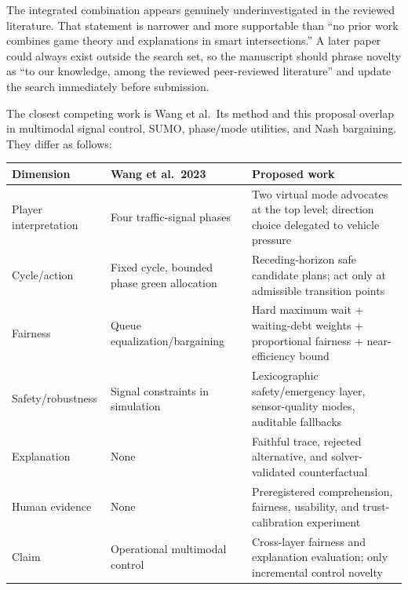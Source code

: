 \documentclass[
  english,
  11pt,
  a4paper,
]{article}
\newcounter{none} %
\begin{document}
The integrated combination appears genuinely underinvestigated in the
reviewed literature. That statement is narrower and more supportable
than ``no prior work combines game theory and explanations in smart
intersections.'' A later paper could always exist outside the search
set, so the manuscript should phrase novelty as ``to our knowledge,
among the reviewed peer-reviewed literature'' and update the search
immediately before submission.

The closest competing work is Wang et al.~Its method and this proposal
overlap in multimodal signal control, SUMO, phase/mode utilities, and
Nash bargaining. They differ as follows:

{\def\LTcaptype{none} %
\begin{longtable}[]{@{}
  >{\raggedright\arraybackslash}p{}
  >{\raggedright\arraybackslash}p{}
  >{\raggedright\arraybackslash}p{}@{}}
\toprule\noalign{}
\begin{minipage}[b]{\linewidth}\raggedright
Dimension
\end{minipage} & \begin{minipage}[b]{\linewidth}\raggedright
Wang et al.~2023
\end{minipage} & \begin{minipage}[b]{\linewidth}\raggedright
Proposed work
\end{minipage} \\
\midrule\noalign{}
\endhead
\bottomrule\noalign{}
\endlastfoot
Player interpretation & Four traffic-signal phases & Two virtual mode
advocates at the top level; direction choice delegated to vehicle
pressure \\
Cycle/action & Fixed cycle, bounded phase green allocation &
Receding-horizon safe candidate plans; act only at admissible transition
points \\
Fairness & Queue equalization/bargaining & Hard maximum wait +
waiting-debt weights + proportional fairness + near-efficiency bound \\
Safety/robustness & Signal constraints in simulation & Lexicographic
safety/emergency layer, sensor-quality modes, auditable fallbacks \\
Explanation & None & Faithful trace, rejected alternative, and
solver-validated counterfactual \\
Human evidence & None & Preregistered comprehension, fairness,
usability, and trust-calibration experiment \\
Claim & Operational multimodal control & Cross-layer fairness and
explanation evaluation; only incremental control novelty \\
\end{longtable}
}
\end{document}
